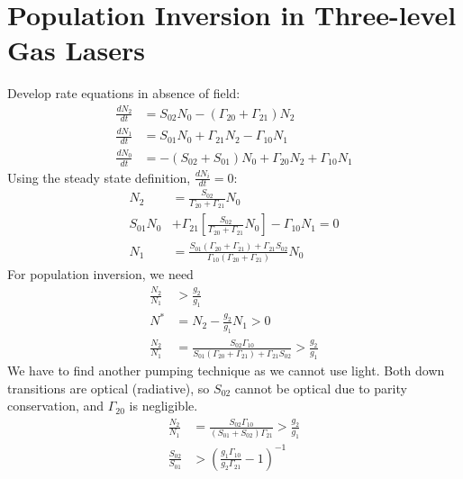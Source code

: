 \documentclass[a4paper, 11pt, normalem]{report}
\begin{document}
\chapter{Population Inversion in Three-level Gas Lasers}
\begin{figure}[H]
    \centering
\end{figure}
Develop rate equations in absence of field:
\begin{align}
    \frac{dN_2}{dt} &= S_{02}N_0 - (\Gamma_{20}+\Gamma_{21})N_2 \\
    \frac{dN_1}{dt} &= S_{01}N_0 + \Gamma_{21}N_2 - \Gamma_{10}N_1 \\
    \frac{dN_0}{dt} &= -(S_{02}+S_{01})N_0 + \Gamma_{20}N_2 + \Gamma_{10}N_1
\end{align}
Using the steady state definition, $\frac{dN_i}{dt}=0$:
\begin{align}
    N_2 &= \frac{S_{02}}{\Gamma_{20}+\Gamma_{21}}N_0 \\
    S_{01}N_0 &+ \Gamma_{21}\left[\frac{S_{02}}{\Gamma_{20}+\Gamma_{21}}N_0\right] - \Gamma_{10}N_1 = 0 \\
    N_1 &= \frac{S_{01}(\Gamma_{20}+\Gamma_{21})+\Gamma_{21}S_{02}}{\Gamma_{10}(\Gamma_{20}+\Gamma_{21})}N_0
\end{align}
For population inversion, we need
\begin{align}
    \frac{N_2}{N_1} &> \frac{g_2}{g_1} \\
    N^* &= N_2 - \frac{g_2}{g_1}N_1 > 0 \\
    \frac{N_2}{N_1} &= \frac{S_{02}\Gamma_{10}}{S_{01}(\Gamma_{20}+\Gamma_{21})+\Gamma_{21}S_{02}} > \frac{g_2}{g_1}
\end{align}
We have to find another pumping technique as we cannot use light. 
Both down transitions are optical (radiative), so $S_{02}$ cannot be optical due to parity conservation, and $\Gamma_{20}$ is negligible.
\begin{align}
    \frac{N_2}{N_1} &= \frac{S_{02}\Gamma_{10}}{(S_{01}+S_{02})\Gamma_{21}} > \frac{g_2}{g_1} \\
    \frac{S_{02}}{S_{01}} &> \left(\frac{g_1\Gamma_{10}}{g_2\Gamma_{21}}-1\right)^{-1}
\end{align}
\end{document}
